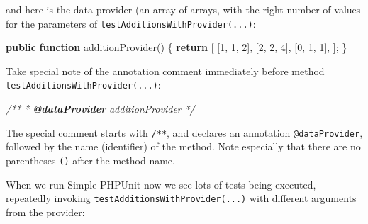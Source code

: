 \documentclass[a4paperpaper,openright]{book}
\newenvironment{Shaded}{}{}
\newcommand{\AnnotationTok}[1]{\textcolor[rgb]{0.38,0.63,0.69}{\textbf{\textit{#1}}}}
\newcommand{\CommentTok}[1]{\textcolor[rgb]{0.38,0.63,0.69}{\textit{#1}}}
\newcommand{\DecValTok}[1]{\textcolor[rgb]{0.25,0.63,0.44}{#1}}
\newcommand{\ExtensionTok}[1]{#1}
\newcommand{\KeywordTok}[1]{\textcolor[rgb]{0.00,0.44,0.13}{\textbf{#1}}}
\newcommand{\NormalTok}[1]{#1}
\newcommand{\OtherTok}[1]{\textcolor[rgb]{0.00,0.44,0.13}{#1}}
\begin{document}
and here is the data provider (an array of arrays, with the right number
of values for the parameters of \texttt{testAdditionsWithProvider(...)}:

\begin{Shaded}
\begin{Highlighting}[]
    \KeywordTok{public} \KeywordTok{function}\NormalTok{ additionProvider}\OtherTok{()}
\NormalTok{    \{}
        \KeywordTok{return} \OtherTok{[}
            \OtherTok{[}\DecValTok{1}\OtherTok{,} \DecValTok{1}\OtherTok{,} \DecValTok{2}\OtherTok{],}
            \OtherTok{[}\DecValTok{2}\OtherTok{,} \DecValTok{2}\OtherTok{,} \DecValTok{4}\OtherTok{],}
            \OtherTok{[}\DecValTok{0}\OtherTok{,} \DecValTok{1}\OtherTok{,} \DecValTok{1}\OtherTok{],}
        \OtherTok{];}
\NormalTok{    \}}
\end{Highlighting}
\end{Shaded}

Take special note of the annotation comment immediately before method
\texttt{testAdditionsWithProvider(...)}:

\begin{Shaded}
\begin{Highlighting}[]
    \CommentTok{/**}
\CommentTok{     * }\AnnotationTok{@dataProvider}\CommentTok{ additionProvider}
\CommentTok{     */}
\end{Highlighting}
\end{Shaded}

The special comment starts with \texttt{/**}, and declares an annotation
\texttt{@dataProvider}, followed by the name (identifier) of the method.
Note especially that there are no parentheses \texttt{()} after the
method name.

When we run Simple-PHPUnit now we see lots of tests being executed,
repeatedly invoking \texttt{testAdditionsWithProvider(...)} with
different arguments from the provider:

\begin{Shaded}
\end{Shaded}
\end{document}
